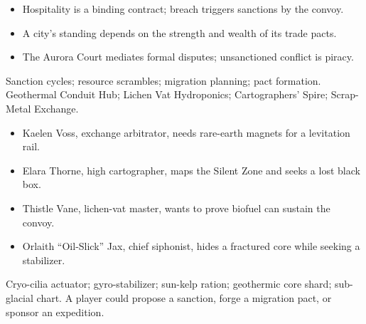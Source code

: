 \documentclass[10pt]{article}
\begin{document}
\begin{minipage}[t]{0.48\linewidth}
\begin{itemize}
\item Hospitality is a binding contract; breach triggers sanctions by the convoy.
\item A city's standing depends on the strength and wealth of its trade pacts.
\item The Aurora Court mediates formal disputes; unsanctioned conflict is piracy.
\end{itemize}
Sanction cycles; resource scrambles; migration planning; pact formation.
Geothermal Conduit Hub; Lichen Vat Hydroponics; Cartographers' Spire; Scrap-Metal Exchange.
\end{minipage}\hfill
\begin{minipage}[t]{0.48\linewidth}
\begin{itemize}
\item Kaelen Voss, exchange arbitrator, needs rare-earth magnets for a levitation rail.
\item Elara Thorne, high cartographer, maps the Silent Zone and seeks a lost black box.
\item Thistle Vane, lichen-vat master, wants to prove biofuel can sustain the convoy.
\item Orlaith ``Oil-Slick'' Jax, chief siphonist, hides a fractured core while seeking a stabilizer.
\end{itemize}
Cryo-cilia actuator; gyro-stabilizer; sun-kelp ration; geothermic core shard; sub-glacial chart. A player could propose a sanction, forge a migration pact, or sponsor an expedition.
\end{minipage}
\end{document}

